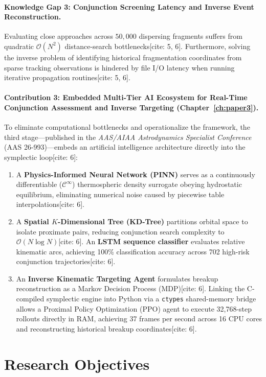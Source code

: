\documentclass[12pt,letterpaper,twoside]{book}
\begin{document}
\paragraph{Knowledge Gap 3: Conjunction Screening Latency and Inverse Event Reconstruction.}
Evaluating close approaches across $50,000$ dispersing fragments suffers from quadratic $\mathcal{O}(N^2)$ distance-search bottlenecks[cite: 5, 6]. Furthermore, solving the inverse problem of identifying historical fragmentation coordinates from sparse tracking observations is hindered by file I/O latency when running iterative propagation routines[cite: 5, 6].

\paragraph{Contribution 3: Embedded Multi-Tier AI Ecosystem for Real-Time Conjunction Assessment and Inverse Targeting (Chapter~\ref{ch:paper3}).}
To eliminate computational bottlenecks and operationalize the framework, the third stage—published in the \textit{AAS/AIAA Astrodynamics Specialist Conference} (AAS 26-993)—embeds an artificial intelligence architecture directly into the symplectic loop[cite: 6]:
\begin{enumerate}
    \item A \textbf{Physics-Informed Neural Network (PINN)} serves as a continuously differentiable ($\mathcal{C}^\infty$) thermospheric density surrogate obeying hydrostatic equilibrium, eliminating numerical noise caused by piecewise table interpolations[cite: 6].
    \item A \textbf{Spatial $K$-Dimensional Tree (KD-Tree)} partitions orbital space to isolate proximate pairs, reducing conjunction search complexity to $\mathcal{O}(N \log N)$[cite: 6]. An \textbf{LSTM sequence classifier} evaluates relative kinematic arcs, achieving 100\% classification accuracy across 702 high-risk conjunction trajectories[cite: 6].
    \item An \textbf{Inverse Kinematic Targeting Agent} formulates breakup reconstruction as a Markov Decision Process (MDP)[cite: 6]. Linking the C-compiled symplectic engine into Python via a \texttt{ctypes} shared-memory bridge allows a Proximal Policy Optimization (PPO) agent to execute 32,768-step rollouts directly in RAM, achieving 37 frames per second across 16 CPU cores and reconstructing historical breakup coordinates[cite: 6].
\end{enumerate}

\section{Research Objectives}
\end{document}
